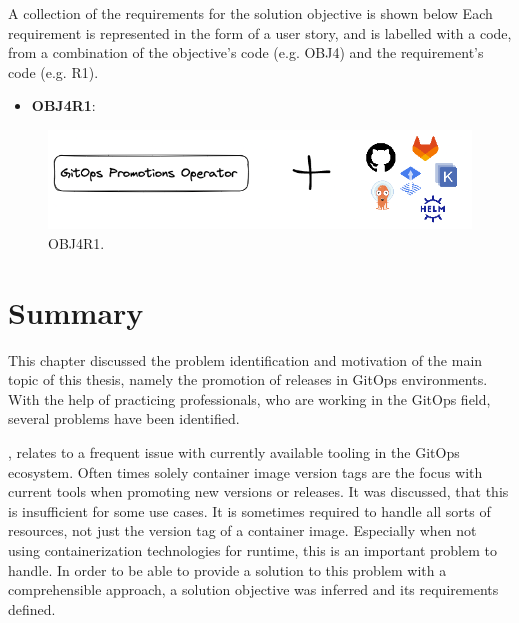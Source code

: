 A collection of the requirements for the solution objective is shown below
Each requirement is represented in the form of a user story,
and is labelled with a code, from a combination of the
objective's code (e.g. OBJ4) and the requirement's code (e.g. R1).

\begin{itemize}
	\item \textbf{OBJ4R1}: 
\end{itemize}

\begin{figure}[h]
	\centering
	\includegraphics[width=0.80\linewidth]{assets/OBJ4R1.png}
	\caption{OBJ4R1.
	}
	\label{fig:OBJ4R1}	
\end{figure}










\section{Summary}

This chapter discussed the problem identification and motivation of the main topic of this thesis,
namely the promotion of releases in GitOps environments.
With the help of practicing professionals, who are working in the GitOps field,
several problems have been identified.

\textbf{},
relates to a frequent issue with currently available tooling in the GitOps ecosystem. 
Often times solely container image version tags are the focus with current tools when promoting
new versions or releases. It was discussed, that this is insufficient for some use cases.
It is sometimes required to handle all sorts of resources, not just the version tag of a container image.
Especially when not using containerization technologies for runtime, this is an important problem to handle.
In order to be able to provide a solution to this problem with a comprehensible approach,
a solution objective was inferred and its requirements defined.

